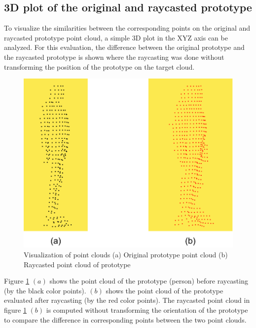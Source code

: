 \subsection{3D plot of the original and raycasted prototype}\label{sec:3dplot}
To visualize the similarities between the corresponding points on the original and raycasted prototype point cloud, a simple 3D plot in the XYZ axis can be analyzed. For this evaluation, the difference between the original prototype and the raycasted prototype is shown where the raycasting was done without transforming the position of the prototype on the target cloud.

\begin{figure}[htbp]
    \centering
    \includegraphics[width=0.75\linewidth]{97_graphics//evaluation/original_vs_raycasted_pcd.pdf}
    \caption[Visualization of point clouds]{Visualization of point clouds (a) Original prototype point cloud (b) Raycasted point cloud of prototype}
    \label{fig:evaluation-original_vs_raycasted_pcd}
\end{figure}

Figure \ref{fig:evaluation-original_vs_raycasted_pcd} \((a)\) shows the point cloud of the prototype (person) before raycasting (by the black color points). \((b)\) shows the point cloud of the prototype evaluated after raycasting  (by the red color points). The raycasted point cloud in figure \ref{fig:evaluation-original_vs_raycasted_pcd} \((b)\) is computed without transforming the orientation of the prototype to compare the difference in corresponding points between the two point clouds.


